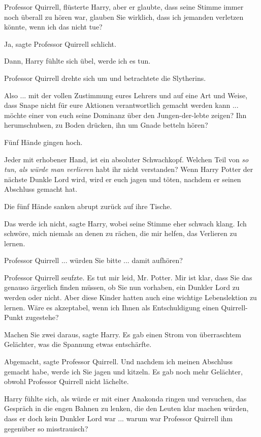 \glqq{}Professor Quirrell\grqq{}, flüsterte Harry, aber er glaubte, dass seine
Stimme immer noch überall zu hören war, \glqq{}glauben Sie wirklich, dass ich
jemanden verletzen könnte, wenn ich das nicht tue?\grqq{}

\glqq{}Ja\grqq{}, sagte Professor Quirrell schlicht.

\glqq{}Dann\grqq{}, Harry fühlte sich übel, \glqq{}werde ich es tun.\grqq{}

Professor Quirrell drehte sich um und betrachtete die Slytherins.

\glqq{}Also ... mit der vollen Zustimmung eures Lehrers und auf eine Art und
Weise, dass Snape nicht für eure Aktionen verantwortlich gemacht werden kann ...
möchte einer von euch seine Dominanz über den Jungen-der-lebte zeigen? Ihn
herumschubsen, zu Boden drücken, ihn um Gnade betteln hören?\grqq{}

Fünf Hände gingen hoch.

\glqq{}Jeder mit erhobener Hand, ist ein absoluter Schwachkopf. Welchen Teil von
\emph{\glqq{}so tun, als würde man verlieren\grqq{}} habt ihr nicht verstanden?
Wenn Harry Potter der nächste Dunkle Lord wird, wird er euch jagen und töten,
nachdem er seinen Abschluss gemacht hat.\grqq{}

Die fünf Hände sanken abrupt zurück auf ihre Tische.

\glqq{}Das werde ich nicht\grqq{}, sagte Harry, wobei seine Stimme eher schwach
klang. \glqq{}Ich schwöre, mich niemals an denen zu rächen, die mir helfen, das
Verlieren zu lernen.

Professor Quirrell ... würden Sie bitte ... damit aufhören?\grqq{}

Professor Quirrell seufzte. \glqq{}Es tut mir leid, Mr. Potter. Mir ist klar,
dass Sie das genauso ärgerlich finden müssen, ob Sie nun vorhaben, ein Dunkler
Lord zu werden oder nicht. Aber diese Kinder hatten auch eine wichtige
Lebenslektion zu lernen. Wäre es akzeptabel, wenn ich Ihnen als Entschuldigung
einen Quirrell-Punkt zugestehe?\grqq{}

\glqq{}Machen Sie zwei daraus\grqq{}, sagte Harry. Es gab einen Strom von
überraschtem Gelächter, was die Spannung etwas entschärfte.

\glqq{}Abgemacht\grqq{}, sagte Professor Quirrell. \glqq{}Und nachdem ich meinen
Abschluss gemacht habe, werde ich Sie jagen und kitzeln.\grqq{} Es gab noch mehr
Gelächter, obwohl Professor Quirrell nicht lächelte.

Harry fühlte sich, als würde er mit einer Anakonda ringen und versuchen, das
Gespräch in die engen Bahnen zu lenken, die den Leuten klar machen würden, dass
er doch kein Dunkler Lord war ... warum war Professor Quirrell ihm gegenüber so
misstrauisch?

